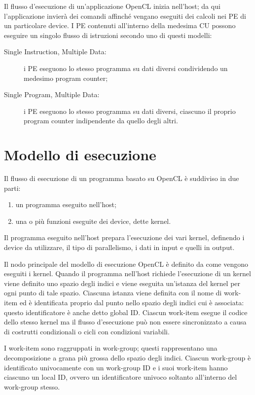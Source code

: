 \documentclass[12pt,a4paper,oneside]{book}
\begin{document}
Il flusso d'esecuzione di un'applicazione \ac{OpenCL} inizia nell'host; da qui l'applicazione invierà dei comandi affinché vengano eseguiti dei calcoli nei \ac{PE} di un particolare device. I \ac{PE} contenuti all'interno della medesima \ac{CU} possono eseguire un singolo flusso di istruzioni secondo uno di questi modelli:
\begin{description}
\item[Single Instruction, Multiple Data:] i \ac{PE} eseguono lo stesso programma su dati diversi condividendo un medesimo program counter;
\item[Single Program, Multiple Data:] i \ac{PE} eseguono lo stesso programma su dati diversi, ciascuno il proprio program counter indipendente da quello degli altri.
\end{description}

\section{Modello di esecuzione}
\label{sec:opencl-execution-model}

Il flusso di esecuzione di un programma basato su \ac{OpenCL} è suddiviso in due parti:
\begin{enumerate}
\item un programma eseguito nell'host;
\item una o più funzioni eseguite dei device, dette kernel.
\end{enumerate}

Il programma eseguito nell'host prepara l'esecuzione dei vari kernel, definendo i device da utilizzare, il tipo di parallelismo, i dati in input e quelli in output.

Il nodo principale del modello di esecuzione \ac{OpenCL} è definito da come vengono eseguiti i kernel. Quando il programma nell'host richiede l'esecuzione di un kernel viene definito uno spazio degli indici e viene eseguita un'istanza del kernel per ogni punto di tale spazio. Ciascuna istanza viene definita con il nome di work-item ed è identificata proprio dal punto nello spazio degli indici cui è associata: questo identificatore è anche detto global ID. Ciascun work-item esegue il codice dello stesso kernel ma il flusso d'esecuzione può non essere sincronizzato a causa di costrutti condizionali o cicli con condizioni variabili.

I work-item sono raggruppati in work-group; questi rappresentano una decomposizione a grana più grossa dello spazio degli indici. Ciascun work-group è identificato univocamente con un work-group ID e i suoi work-item hanno ciascuno un local ID, ovvero un identificatore univoco soltanto all'interno del work-group stesso.
\end{document}
